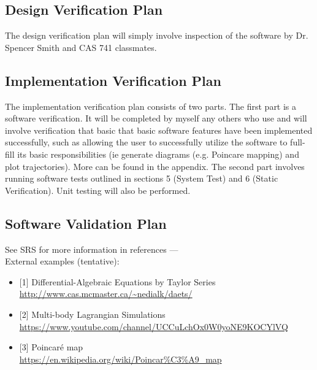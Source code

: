 \documentclass[12pt, titlepage]{article}
\begin{document}
\subsection{Design Verification Plan}

The design verification plan will simply involve inspection of the software by 
Dr. Spencer Smith and CAS 741 classmates. \\ 


\subsection{Implementation Verification Plan}

The implementation verification plan consists of two parts. The first part 
is a software verification. It will be completed by myself any others who 
use \progname and will involve verification that basic that basic software 
features have been implemented successfully, 
such as allowing the user to successfully utilize the software to full-fill
its basic responsibilities (ie generate diagrams (e.g. Poincare
mapping) and plot trajectories). 
More can be found in the appendix. The 
second part involves running software tests 
outlined in sections 5 (System Test) and 6 (Static Verification). 
Unit testing will also be performed. 


\subsection{Software Validation Plan}

See SRS for more information in references ---\\
External examples (tentative):

\begin{itemize}
\item{[1]} Differential-Algebraic Equations by Taylor Series
\\\url{http://www.cas.mcmaster.ca/~nedialk/daets/}
\item{[2]} Multi-body Lagrangian Simulations
\\\url{https://www.youtube.com/channel/UCCuLchOx0W0yoNE9KOCYlVQ}
\item{[3]} Poincaré map
\\\url{https://en.wikipedia.org/wiki/Poincar%C3%A9_map}
\end{itemize}
\end{document}
